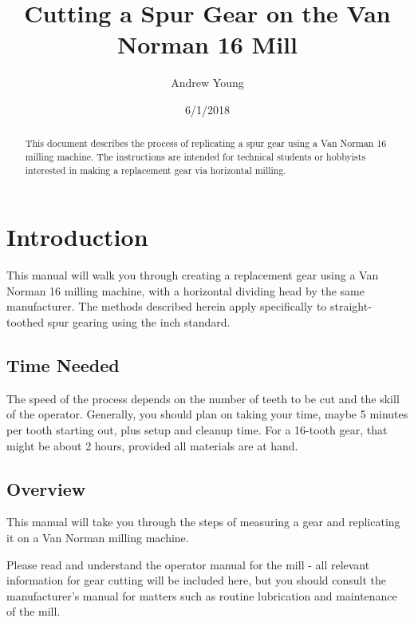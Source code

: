 \documentclass[12pt,twoside,letterpaper]{article}
\begin{document}
\title{Cutting a Spur Gear on the Van Norman 16 Mill}
\author{Andrew Young}
\date{6/1/2018}


\maketitle

\begin{abstract}
This document describes the process of replicating a spur gear using a Van Norman 16 milling machine. The instructions are intended for technical students or hobbyists interested in making a replacement gear via horizontal milling.
\end{abstract}

\clearpage

\tableofcontents

\section{Introduction}

This manual will walk you through creating a replacement gear using a Van Norman 16 milling machine, with a horizontal dividing head by the same manufacturer. The methods described herein apply specifically to straight-toothed spur gearing using the inch standard. 

\subsection{ Time Needed}

The speed of the process depends on the number of teeth to be cut and the skill of the operator. Generally, you should plan on taking your time, maybe 5 minutes per tooth starting out, plus setup and cleanup time. For a 16-tooth gear, that might be about 2 hours, provided all materials are at hand.


\subsection{Overview}

This manual will take you through the steps of measuring a gear and replicating it on a Van Norman milling machine. 


Please read and understand the operator manual for the mill - all relevant information for gear cutting will be included here, but you should consult the manufacturer's manual for matters such as routine lubrication and maintenance of the mill.
\end{document}
